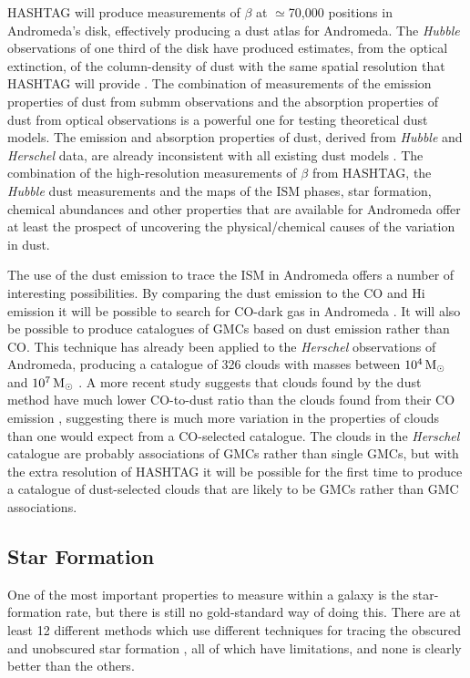 \documentclass[a4paper,fleqn,usenatbib, twocolumn]{aastex63}
\begin{document}
HASHTAG will produce measurements of $\beta$ at $\simeq$70,000 positions in
Andromeda's disk, effectively producing a dust atlas for Andromeda. The
{\it Hubble} observations of one third of the disk have produced estimates,
from the optical extinction,
of the column-density of dust with the same spatial resolution that HASHTAG will provide
\citep{dalcanton2012}. The combination of measurements of the emission
properties of dust from submm observations and the absorption properties
of dust from optical observations is a powerful one for testing theoretical
dust models. The emission and absorption properties of dust, derived from {\it Hubble} and {\it Herschel} data,
are already inconsistent with all existing dust models \citep{Whitworth2019}. The combination of the high-resolution measurements of $\beta$ from HASHTAG, the {\it Hubble} dust measurements and the maps of the ISM phases, star formation, chemical abundances and other properties that are available for Andromeda offer at least the prospect
of uncovering the physical/chemical causes of the variation in dust.

The use of the dust emission to trace the ISM in Andromeda offers a number
of interesting possibilities. By comparing the dust emission to the CO and H{\sc i} emission it will be possible to search for CO-dark gas in Andromeda \citep{planck2011,sandstrom2013}. It will also be possible to produce catalogues
of GMCs based on dust emission rather than CO. This technique has already
been applied to the {\it Herschel} observations of Andromeda, producing
a catalogue of 326 clouds with masses between
$\rm10^4\,M_{\odot}$ and $\rm 10^7\,M_{\odot}$ \citep{kirk2015}. A more recent
study suggests that clouds found by the dust method have much lower CO-to-dust ratio
than the clouds found from their CO emission \citep{Eknath2021}, suggesting there
is much more variation in the properties of clouds than one would expect from
a CO-selected catalogue. The clouds in the {\it Herschel} catalogue are probably
associations of GMCs rather than single GMCs, but with the extra resolution of HASHTAG it will be possible for the first time to produce a catalogue of dust-selected clouds that are likely to be GMCs rather than GMC associations.

\subsection{Star Formation}

One of the most important properties to measure within a galaxy is
the star-formation rate, but there is still no gold-standard way
of doing this. There are at least 12 different methods which use
different techniques for tracing the obscured and unobscured star formation \citep{kennicutt2012,Speagle2014,davies2016}, all of which have limitations, and none
is clearly better than the others.
\end{document}
